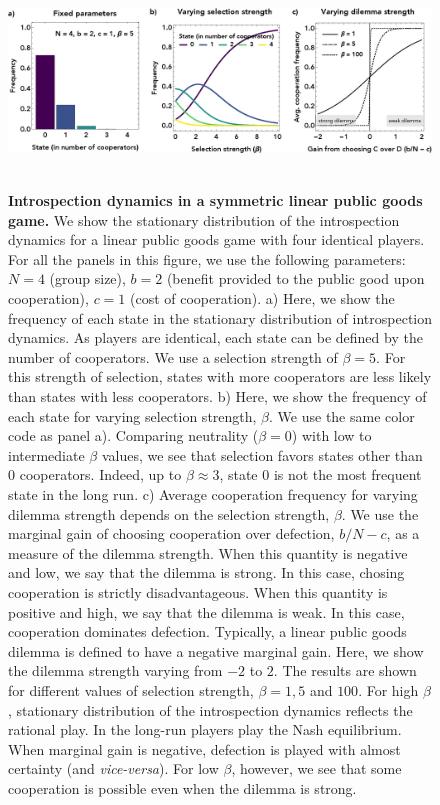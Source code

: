 \documentclass[11pt]{article}
\theoremstyle{plainCl1}
\theoremstyle{plainCl2}
\begin{document}
\begin{figure}
\centering
\includegraphics[width =  \textwidth]{figures/Fig1.eps}~\\[0.4cm]
\caption{\onehalfspacing
\textbf{Introspection dynamics in a symmetric linear public goods game.}
We show the stationary distribution of the introspection dynamics for a linear public goods game with four identical players. For all the panels in this figure, we use the following parameters: $N = 4$ (group size), $b = 2$ (benefit provided to the public good upon cooperation), $c = 1$ (cost of cooperation). a) Here, we show the frequency of each state in the stationary distribution of introspection dynamics. As players are identical, each state can be defined by the number of cooperators. We use a selection strength of $\beta = 5$. For this strength of selection, states with more cooperators are less likely than states with less cooperators. b) Here, we show the frequency of each state for varying selection strength, $\beta$. We use the same color code as panel a). Comparing neutrality ($\beta = 0$) with low to intermediate $\beta$ values, we see that selection favors states other than 0 cooperators. Indeed, up to $\beta \approx 3$, state $0$ is not the most frequent state in the long run. c) Average cooperation frequency for varying dilemma strength depends on the selection strength, $\beta$. We use the marginal gain of choosing cooperation over defection, $b/N - c$, as a measure of the dilemma strength. When this quantity is negative and low, we say that the dilemma is strong. In this case, chosing cooperation is strictly disadvantageous. When this quantity is positive and high, we say that the dilemma is weak. In this case, cooperation dominates defection. Typically, a linear public goods dilemma is defined to have a negative marginal gain. Here, we show the dilemma strength varying from $-2$ to $2$. The results are shown for different values of selection strength, $\beta = 1, 5$ and $100$. For high $\beta$, stationary distribution of the introspection dynamics reflects the rational play. In the long-run players play the Nash equilibrium. When marginal gain is negative, defection is played with almost certainty (and \emph{vice-versa}). For low $\beta$, however, we see that some cooperation is possible even when the dilemma is strong. }
\label{Fig:LPGG-symmetric}
\end{figure}
\end{document}
